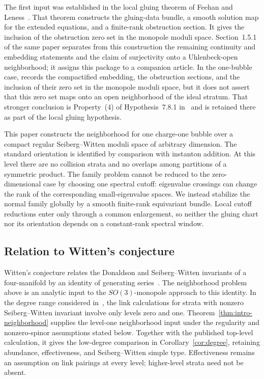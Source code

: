 \documentclass[11pt]{amsart}
\theoremstyle{definition}
\theoremstyle{remark}
\theoremstyle{plain}
\begin{document}
The first input was established in the local gluing theorem of Feehan and
Leness~\cite{FeehanLenessIII}.  That theorem constructs the gluing-data
bundle, a smooth solution map for the extended equations, and a finite-rank
obstruction section.  It gives the inclusion of the obstruction zero set in
the monopole moduli space.  Section~1.5.1 of the same paper separates from
this construction the remaining continuity and embedding statements and the
claim of surjectivity onto a Uhlenbeck-open neighborhood; it assigns this
package to a companion article.  In the one-bubble case,
\cite[Theorem~3.8]{FeehanLenessLevelOne} records the compactified embedding,
the obstruction sections, and the inclusion of their zero set in the monopole
moduli space, but it does not assert that this zero set maps onto an open
neighborhood of the ideal stratum.  That stronger conclusion is Property~(4)
of Hypothesis~7.8.1 in~\cite{FeehanLenessCobordism} and is retained there as
part of the local gluing hypothesis.

This paper constructs the neighborhood for one charge-one bubble
over a compact regular Seiberg--Witten moduli space of arbitrary dimension.
The standard orientation is identified by comparison with instanton
addition.  At this level there are no collision strata and no overlaps
among partitions of a symmetric product.  The family problem cannot be
reduced to the zero-dimensional case by choosing one spectral cutoff:
eigenvalue crossings can change the rank of the corresponding
small-eigenvalue spaces.  We instead stabilize the normal family globally by a smooth
finite-rank equivariant bundle.  Local cutoff reductions enter only through
a common enlargement, so neither the gluing chart nor its orientation
depends on a constant-rank spectral window.

\subsection{Relation to Witten's conjecture}
Witten's conjecture relates the Donaldson and Seiberg--Witten invariants
of a four-manifold by an identity of generating series~\cite{Witten94}.
The neighborhood problem above is an analytic input to the
$SO(3)$-monopole approach to this identity.  In the degree range considered
in~\cite{FeehanLenessLevelOne}, the link calculations for strata with
nonzero Seiberg--Witten invariant involve only levels zero and one.
Theorem~\ref{thm:intro-neighborhood} supplies the level-one neighborhood
input under the regularity and nonzero-spinor assumptions stated below.
Together with the published top-level calculation, it gives the
low-degree comparison in Corollary~\ref{cor:degree}, retaining abundance,
effectiveness, and Seiberg--Witten simple type.  Effectiveness remains an
assumption on link pairings at every level; higher-level strata need not
be absent.
\end{document}

